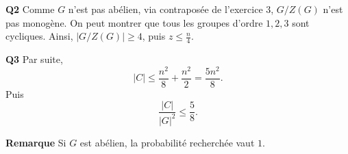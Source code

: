 \documentclass[11pt,a4paper]{article}
\begin{document}
\textbf{Q2} Comme $G$ n'est pas abélien, via contraposée de l'exercice 3, $G/Z(G)$ n'est pas monogène. On peut montrer que tous les groupes d'ordre $1,2,3$ sont cycliques. Ainsi, $|G/Z(G)|\geq4$, puis $z\leq\frac n4$.

\textbf{Q3} Par suite,
\[
|C|\leq\frac{n^2}{8}+\frac{n^2}{2}=\frac{5n^2}{8}.
\]
Puis
\[
\frac{|C|}{|G|^2}\leq\frac58.
\]

\textbf{Remarque} Si $G$ est abélien, la probabilité recherchée vaut $1$.
\end{document}
